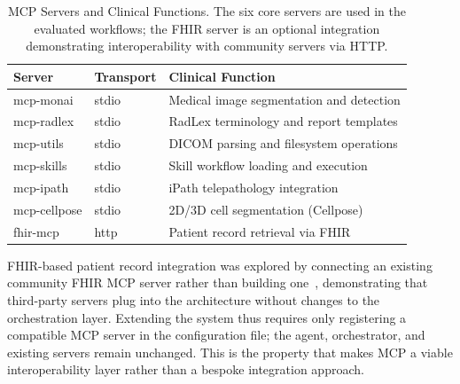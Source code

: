 \documentclass[conference]{IEEEtran}
\begin{document}
\begin{table}[t]
  \caption{MCP Servers and Clinical Functions. The six core servers are used in the evaluated workflows; the FHIR server is an optional integration demonstrating interoperability with community servers via HTTP.}
  \label{tab:mcp-servers}
  \centering
  \begin{tabular}{lll}
    \toprule
    Server & Transport & Clinical Function \\
    \midrule
    mcp-monai    & stdio & Medical image segmentation and detection \\
    mcp-radlex   & stdio & RadLex terminology and report templates \\
    mcp-utils    & stdio & DICOM parsing and filesystem operations \\
    mcp-skills   & stdio & Skill workflow loading and execution \\
    mcp-ipath    & stdio & iPath telepathology integration \\
    mcp-cellpose & stdio & 2D/3D cell segmentation (Cellpose) \\
    fhir-mcp     & http  & Patient record retrieval via FHIR \\
    \bottomrule
  \end{tabular}
\end{table}

FHIR-based patient record integration was explored by connecting an existing community FHIR MCP server rather than building one~\cite{ehtesham2025mcpfhir}, demonstrating that third-party servers plug into the architecture without changes to the orchestration layer. Extending the system thus requires only registering a compatible MCP server in the configuration file; the agent, orchestrator, and existing servers remain unchanged. This is the property that makes MCP a viable interoperability layer rather than a bespoke integration approach.
\end{document}
